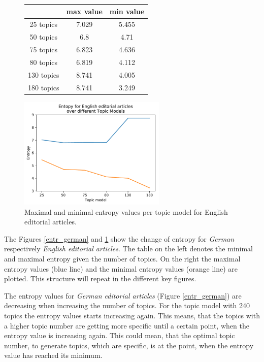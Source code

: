 \begin{figure}
	\begin{minipage}{0.5\textwidth}
		\centering
		\begin{tabular}[t]{c|cc}
			&max value & min value\\
			\hline
			25 topics&7.029&5.455\\
			50 topics&6.8&4.71\\
			75 topics&6.823&4.636\\
			80 topics&	6.819&4.112\\
			130 topics & 8.741&4.005\\
			180 topics&	8.741&3.249\\
		\end{tabular}
	\end{minipage}%
	\begin{minipage}{0.5\textwidth}
		\centering
		\includegraphics[width=7cm]{gfx/Eval_IC/English_Editorial_Entropy.pdf}
	\end{minipage}
	\caption{Maximal and minimal entropy values per topic model for English editorial articles.}
	\label{entr_english}
\end{figure}
The Figures \ref{entr_german} and \ref{entr_english} show the change of entropy for \textit{German} respectively \textit{English editorial articles}. The table on the left denotes the minimal and maximal entropy given the number of topics. On the right the maximal entropy values (blue line) and the minimal entropy values (orange line) are plotted. This structure will repeat in the different key figures.

The entropy values for \textit{German editorial articles} (Figure \ref{entr_german}) are decreasing when increasing the number of topics. For the topic model with 240 topics the entropy values starts increasing again. This means, that the topics with a higher topic number are getting more specific until a certain point, when the entropy value is increasing again. This could mean, that the optimal topic number, to generate topics, which are specific, is at the point, when the entropy value has reached its minimum.

